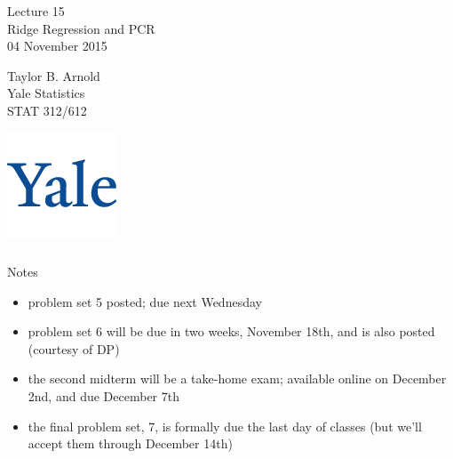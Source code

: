 



\begin{frame}[fragile] \frametitle{}

\vfill

{\fontsize{0.7cm}{0cm}\selectfont Lecture 15 \\\vspace{0.2cm}
Ridge Regression and PCR}\\\vspace{0.5cm}
04 November 2015

\vspace{2cm}

\begin{minipage}{0.6\textwidth}
Taylor B. Arnold \\
Yale Statistics \\
STAT 312/612
\end{minipage}
\hfill
\begin{minipage}{0.3\textwidth}\raggedleft
\includegraphics[scale=0.3]{../yale-logo.png}
\end{minipage}%


\end{frame}

\begin{frame}[fragile] \frametitle{}

{\color{yaleblue}\fontsize{16pt}{20pt}\selectfont Notes}

\begin{itemize}
\item problem set 5 posted; due next Wednesday \pause
\item problem set 6 will be due in two weeks, November 18th,
  and is also posted (courtesy of DP) \pause
\item the second midterm will be a take-home exam; available online on
  December 2nd, and due December 7th \pause
\item the final problem set, 7, is formally due the last day of
  classes (but we'll accept them through December 14th)
\end{itemize}

\end{frame}

